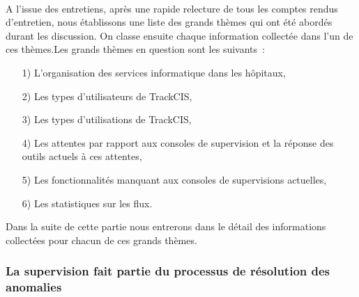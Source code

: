 			\paragraph{}%
			A l'issue des entretiens, après une rapide relecture de tous les comptes
			rendus d'entretien, nous établissons une liste des grands thèmes qui ont été
			abordés durant les discussion.
			On classe ensuite chaque information collectée dans l'un de ces
			thèmes.\newline Les grands thèmes en question sont les suivants~:
			\begin{itemize}
			  \item[1)] L’organisation des services informatique dans les
			  hôpitaux,
			  \item[2)] Les types d’utilisateurs de TrackCIS,
			  \item[3)] Les types d’utilisations de TrackCIS,
			  \item[4)] Les attentes par rapport aux consoles de supervision
			  et la réponse des outils actuels à ces attentes,
			  \item[5)] Les fonctionnalités manquant aux consoles de
			  supervisions actuelles,
			  \item[6)] Les statistiques sur les flux.
			\end{itemize}
			Dans la suite de cette partie nous entrerons dans le détail des informations
			collectées pour chacun de ces grands thèmes.
			
		\subsubsection{La supervision fait partie du processus de résolution des
		anomalies}
